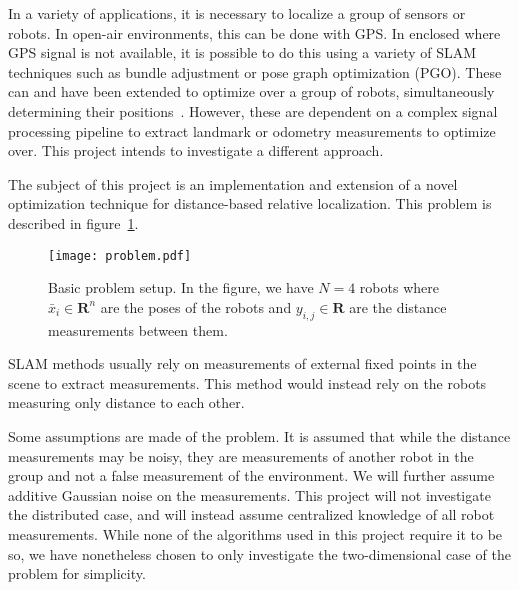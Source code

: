 In a variety of applications, it is necessary to localize a group of sensors or robots. In open-air environments, this can be done with GPS. In enclosed where GPS signal is not available, it is possible to do this using a variety of SLAM techniques such as bundle adjustment or pose graph optimization (PGO). These can and have been extended to optimize over a group of robots, simultaneously determining their positions~\cite{SLAM_distributed}. However, these are dependent on a complex signal processing pipeline to extract landmark or odometry measurements to optimize over. This project intends to investigate a different approach. 

The subject of this project is an implementation and extension of a novel optimization technique for distance-based relative localization. This problem is described in figure~\ref{fig:problem_desc}.
\begin{figure}[ht]
    \centering
    \texttt{[image: problem.pdf]}
    \caption{Basic problem setup. In the figure, we have $N=4$ robots where $\bar{x}_i\in \mathbf{R}^n$ are the poses of the robots and $y_{i,j} \in \mathbf{R}$ are the distance measurements between them. }
    \label{fig:problem_desc}
\end{figure}

SLAM  methods usually rely on measurements of external fixed points in the scene to extract measurements. This method would instead rely on the robots measuring only distance to each other. 

Some assumptions are made of the problem. It is assumed that while the distance measurements may be noisy, they are measurements of another robot in the group and not a false measurement of the environment. We will further assume additive Gaussian noise on the measurements. This project will not investigate the distributed case, and will instead assume centralized knowledge of all robot measurements. While none of the algorithms used in this project require it to be so, we have nonetheless chosen to only investigate the two-dimensional case of the problem for simplicity. 